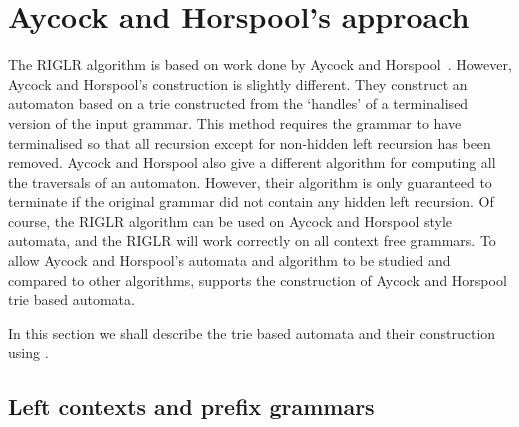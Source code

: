 




\section{Aycock and Horspool's approach}

The RIGLR algorithm is based on work done by Aycock and
Horspool~\cite{AH99}. However, Aycock and Horspool's construction is
slightly different. They construct an automaton based on a trie
constructed from the `handles' of a terminalised version of the input
grammar. This method requires the grammar to have terminalised so that
all recursion except for non-hidden left recursion has been removed. 
Aycock and Horspool also give a different algorithm for computing all
the traversals of an automaton. However, their algorithm is only
guaranteed to terminate if the original grammar did not contain any
hidden left recursion. Of course, the RIGLR algorithm can be used on
Aycock and Horspool style automata, and the RIGLR will work correctly
on all context free grammars. To allow Aycock and Horspool's automata
and algorithm to be studied and compared to other algorithms, \gtb
supports the construction of Aycock and Horspool trie based automata.

In this section we shall describe the trie based automata and their
construction using \gtbs.

\subsection{Left contexts and prefix grammars}\label{ex15}

